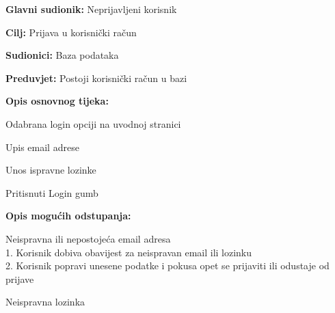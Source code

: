 					\noindent {}
					\begin{packed_item}
						\item \textbf{Glavni sudionik:} Neprijavljeni korisnik
						\item \textbf{Cilj:} Prijava u korisnički račun
						\item \textbf{Sudionici:} Baza podataka
						\item \textbf{Preduvjet:} Postoji korisnički račun u bazi
						\item \textbf{Opis osnovnog tijeka:}
						\begin{packed_enum}
							\item Odabrana login opciji na uvodnoj stranici
							\item Upis email adrese
							\item Unos ispravne lozinke
							\item Pritisnuti Login gumb
						\end{packed_enum}
						\item \textbf{Opis mogućih odstupanja:}
						\begin{packed_item}
							\item[2.a] Neispravna ili nepostojeća email adresa
							\\1. Korisnik dobiva obavijest za neispravan email ili lozinku
							\\2. Korisnik popravi unesene podatke i pokusa opet se prijaviti ili odustaje od prijave
							\item[3.a] Neispravna lozinka
						\end{packed_item}
					\end{packed_item}
					
